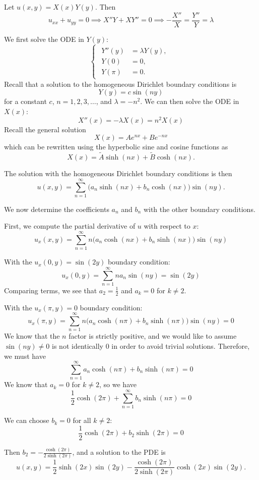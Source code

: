 \documentclass[plain]{pset}
\begin{document}
\begin{solution}
    Let \(u(x, y) = X(x)Y(y)\). Then
    \[u_{xx} + u_{yy} = 0 \implies X''Y + XY'' = 0 \implies -\frac{X''}{X} = \frac{Y''}{Y} = \lambda\]

    We first solve the ODE in \(Y(y)\):
    \[
        \begin{cases}
            \begin{aligned}
                Y''(y) & = \lambda Y(y), \\
                Y(0)   & = 0,            \\
                Y(\pi) & = 0.
            \end{aligned}
        \end{cases}
    \]
    Recall that a solution to the homogeneous Dirichlet boundary conditions is
    \[Y(y) = c \sin(ny)\]
    for a constant \(c\), \(n = 1, 2, 3, \ldots\), and \(\lambda = -n^2\). We can then solve the ODE in \(X(x)\):
    \[X''(x) = -\lambda X(x) = n^2 X(x)\]
    Recall the general solution
    \[X(x) = Ae^{nx} + Be^{-nx}\]
    which can be rewritten using the hyperbolic sine and cosine functions as
    \[X(x) = \tilde{A}\sinh(nx) + \tilde{B}\cosh(nx).\]

    The solution with the homogeneous Dirichlet boundary conditions is then
    \[u(x, y) = \sum_{n=1}^\infty \bigl(a_n\sinh(nx) + b_n\cosh(nx)\bigr)\sin(ny).\]

    We now determine the coefficients \(a_n\) and \(b_n\) with the other boundary conditions.

    First, we compute the partial derivative of \(u\) with respect to \(x\):
    \[u_x(x, y) = \sum_{n=1}^\infty n\bigl(a_n\cosh(nx) + b_n\sinh(nx)\bigr)\sin(ny)\]

    With the \(u_x(0, y) = \sin(2y)\) boundary condition:
    \[u_x(0, y) = \sum_{n=1}^\infty n a_n \sin(ny) = \sin(2y)\]
    Comparing terms, we see that \(a_2 = \frac{1}{2}\) and \(a_k = 0\) for \(k \neq 2\).

    With the \(u_x(\pi, y) = 0\) boundary condition:
    \[u_x(\pi, y) = \sum_{n=1}^\infty n\bigl(a_n\cosh(n\pi) + b_n\sinh(n\pi)\bigr)\sin(ny) = 0\]
    We know that the \(n\) factor is strictly positive, and we would like to assume \(\sin(ny) \neq 0\) is not identically 0 in order to avoid trivial solutions. Therefore, we must have
    \[\sum_{n=1}^\infty a_n\cosh(n\pi) + b_n\sinh(n\pi) = 0\]
    We know that \(a_k = 0\) for \(k \neq 2\), so we have
    \[\frac{1}{2}\cosh(2\pi) + \sum_{n=1}^\infty b_n\sinh(n\pi) = 0\]

    We can choose \(b_k = 0\) for all \(k \neq 2\):
    \[\frac{1}{2}\cosh(2\pi) + b_2\sinh(2\pi) = 0\]

    Then \(b_2 = -\frac{\cosh(2\pi)}{2\sinh(2\pi)}\), and a solution to the PDE is
    \[u(x, y) = \frac{1}{2}\sinh(2x)\sin(2y) - \frac{\cosh(2\pi)}{2\sinh(2\pi)}\cosh(2x)\sin(2y).\]
\end{solution}
\end{document}
